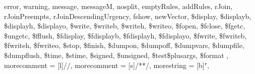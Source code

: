 {{    error, warning, message, messageM,
    nosplit, emptyRules, addRules, rJoin, rJoinPreempts, rJoinDescendingUrgency,
    fshow, newVector,
    \$display,
    \$displayb,
    \$displayh,
    \$displayo,
    \$write,
    \$writeb,
    \$writeh,
    \$writeo,
    \$fopen,
    \$fclose,
    \$fgetc,
    \$ungetc,
    \$fflush,
    \$fdisplay,
    \$fdisplayb,
    \$fdisplayh,
    \$fdisplayo,
    \$fwrite,
    \$fwriteb,
    \$fwriteh,
    \$fwriteo,
    \$stop,
    \$finish,
    \$dumpon,
    \$dumpoff,
    \$dumpvars,
    \$dumpfile,
    \$dumpflush,
    \$time,
    \$stime,
    \$signed,
    \$unsigned,
    \$test\$plusargs,
    \$format
  },
  morecomment = [l]{//},
  morecomment = [s]{/*}{*/},
  morestring = [b]",
}